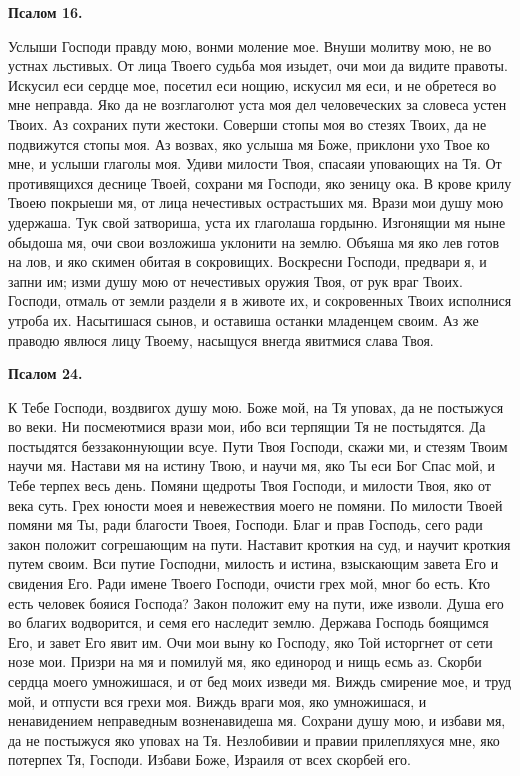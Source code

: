 \bfseries Псалом 16.\normalfont{}


Услыши Господи правду мою, вонми моление мое. Внуши молитву мою, не во устнах льстивых. От лица Твоего судьба моя изыдет, очи мои да видите правоты. Искусил еси сердце мое, посетил еси нощию, искусил мя еси, и не обретеся во мне неправда. Яко да не возглаголют уста моя дел человеческих за словеса устен Твоих. Аз сохраних пути жестоки. Соверши стопы моя во стезях Твоих, да не подвижутся стопы моя. Аз возвах, яко услыша мя Боже, приклони ухо Твое ко мне, и услыши глаголы моя. Удиви милости Твоя, спасаяи уповающих на Тя. От противящихся деснице Твоей, сохрани мя Господи, яко зеницу ока. В крове крилу Твоею покрыеши мя, от лица нечестивых острастьших мя. Врази мои душу мою удержаша. Тук свой затвориша, уста их глаголаша гордыню. Изгонящии мя ныне обыдоша мя, очи свои возложиша уклонити на землю. Объяша мя яко лев готов на лов, и яко скимен обитая в сокровищих. Воскресни Господи, предвари я, и запни им; изми душу мою от нечестивых оружия Твоя, от рук враг Твоих. Господи, отмаль от земли раздели я в животе их, и сокровенных Твоих исполнися утроба их. Насытишася сынов, и оставиша останки младенцем своим. Аз же праводю явлюся лицу Твоему, насыщуся внегда явитмися слава Твоя.


\medskip


\bfseries Псалом 24.\normalfont{}


К Тебе Господи, воздвигох душу мою. Боже мой, на Тя уповах, да не постыжуся во веки. Ни посмеютмися врази мои, ибо вси терпящии Тя не постыдятся. Да постыдятся беззаконнующии всуе. Пути Твоя Господи, скажи ми, и стезям Твоим научи мя. Настави мя на истину Твою, и научи мя, яко Ты еси Бог Спас мой, и Тебе терпех весь день. Помяни щедроты Твоя Господи, и милости Твоя, яко от века суть. Грех юности моея и невежествия моего не помяни. По милости Твоей помяни мя Ты, ради благости Твоея, Господи. Благ и прав Господь, сего ради закон положит согрешающим на пути. Наставит кроткия на суд, и научит кроткия путем своим. Вси путие Господни, милость и истина, взыскающим завета Его и свидения Его. Ради имене Твоего Господи, очисти грех мой, мног бо есть. Кто есть человек бояися Господа? Закон положит ему на пути, иже изволи. Душа его во благих водворится, и семя его наследит землю. Держава Господь боящимся Его, и завет Его явит им. Очи мои выну ко Господу, яко Той исторгнет от сети нозе мои. Призри на мя и помилуй мя, яко единород и нищь есмь аз. Скорби сердца моего умножишася, и от бед моих изведи мя. Виждь смирение мое, и труд мой, и отпусти вся грехи моя. Виждь враги моя, яко умножишася, и ненавидением неправедным возненавидеша мя. Сохрани душу мою, и избави мя, да не постыжуся яко уповах на Тя. Незлобивии и правии прилепляхуся мне, яко потерпех Тя, Господи. Избави Боже, Израиля от всех скорбей его. 


